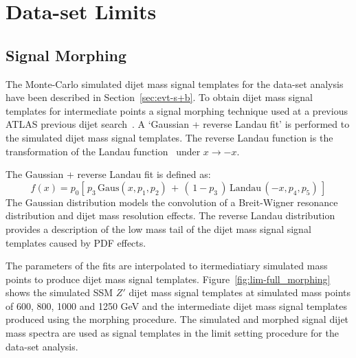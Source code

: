 \FloatBarrier

\section{\lm{} Data-set Limits}
\label{sec:lim-full}

\subsection{Signal Morphing}
\label{sec:lim-full_morphing}

The Monte-Carlo simulated dijet mass signal templates for the \lm{} data-set analysis have been described in Section~\ref{sec:evt-s+b}.
To obtain dijet mass signal templates for intermediate points a signal morphing technique used at a previous ATLAS previous dijet search~\cite{dijet-mori17_paper}.
A `Gaussian + reverse Landau fit' is performed to the simulated dijet mass signal templates.
The reverse Landau function is the transformation of the Landau function~\cite{lim-landau} under $x\to-x$.

\noindent
The Gaussian + reverse Landau fit is defined as:
\begin{equation}
  f(x)=p_0 \left[ \,p_3\,\mathrm{Gaus}\left(x,p_1,p_2\right)\,+\,\left(\,1-p_3\,\right)\,\mathrm{Landau}\,\left(-x,p_4,p_5\right)\, \right]
\end{equation}
The Gaussian distribution models the convolution of a Breit-Wigner resonance distribution and dijet mass resolution effects.
The reverse Landau distribution provides a description of the low mass tail of the dijet mass signal signal templates caused by PDF effects.

The parameters of the fits are interpolated to itermediatiary simulated mass points to produce dijet mass signal templates.
Figure~\ref{fig:lim-full_morphing} shows the simulated SSM $Z'$ dijet mass signal templates at simulated mass points of 600, 800, 1000 and 1250 GeV
and the intermediate dijet mass signal templates produced using the morphing procedure.
The simulated and morphed signal dijet mass spectra are used as signal templates in the limit setting procedure for the \lm{} data-set analysis.
  
